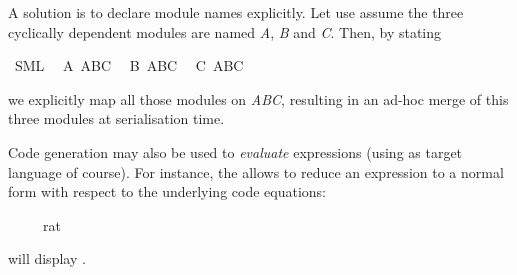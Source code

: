 \begin{isabellebody}
\begin{isamarkuptext}
  A solution is to declare module names explicitly.
  Let use assume the three cyclically dependent
  modules are named \emph{A}, \emph{B} and \emph{C}.
  Then, by stating%
\end{isamarkuptext}%
\isamarkuptrue%
%
\isadelimquote
%
\endisadelimquote
%
\isatagquote
{}\isamarkupfalse%
\ SML\isanewline
\ \ A\ ABC\isanewline
\ \ B\ ABC\isanewline
\ \ C\ ABC%
\endisatagquote
{\isafoldquote}%
%
\isadelimquote
%
\endisadelimquote
%
\begin{isamarkuptext}%
we explicitly map all those modules on \emph{ABC},
  resulting in an ad-hoc merge of this three modules
  at serialisation time.%
\end{isamarkuptext}%
\isamarkuptrue%
%
\isamarkuptrue%
%
\begin{isamarkuptext}%
Code generation may also be used to \emph{evaluate} expressions
  (using  as target language of course).
  For instance, the \hyperlink{command.value}{\mbox{}} allows to reduce an expression to a
  normal form with respect to the underlying code equations:%
\end{isamarkuptext}%
\isamarkuptrue%
%
\isadelimquote
%
\endisadelimquote
%
\isatagquote
{}\isamarkupfalse%
\ {\isachardoublequoteopen}{}{}\ {\isacharslash}\ {\isacharparenleft}{}{}\ {\isacharcolon}{\isacharcolon}\ rat{\isacharparenright}{\isachardoublequoteclose}%
\endisatagquote
{\isafoldquote}%
%
\isadelimquote
%
\endisadelimquote
%
\begin{isamarkuptext}%
\noindent will display .


\end{isamarkuptext}
\end{isabellebody}
